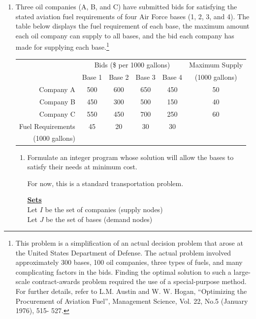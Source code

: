 \documentclass[letterpaper,oneside,12pt]{article}%
\newcommand{\blu}{\color{blue}}
\begin{document}
\begin{enumerate}
\begin{enumerate}
{}
\end{enumerate}

\newpage

\item Three oil companies (A, B, and C) have submitted bids for satisfying the stated
aviation fuel requirements of four Air Force bases (1, 2, 3, and 4). The table
below displays the fuel requirement of each base, the maximum amount each oil
company can supply to all bases, and the bid each company has made for
supplying each base.\footnote{This problem is a simplification of an actual decision problem
that arose at the United States Department of Defense. The actual problem
involved approximately 300 bases, 100 oil companies, three types of fuels, and
many complicating factors in the bids. Finding the optimal solution to such a
large-scale contract-awards problem required the use of a special-purpose
method. For further details, refer to L.M. Austin and W. W. Hogan, ``Optimizing
the Procurement of Aviation Fuel'', Management Science, Vol. 22, No.5 (January
1976), 515- 527.}

\begin{center}\begin{tabular}{|r|cccc|c|}\hline
    & \multicolumn{4}{c|}{Bids (\$ per 1000 gallons)} & Maximum Supply \\\cline{2-5}
    & Base 1 & Base 2 & Base 3 & Base 4 & (1000 gallons) \\\hline
  Company A & 500 & 600 & 650 & 450 & 50 \\
  Company B & 450 & 300 & 500 & 150 & 40 \\
  Company C & 550 & 450 & 700 & 250 & 60 \\\hline
  Fuel Requirements & 45 & 20 & 30 & 30 & \\
  (1000 gallons) &  &  &  &  & \\\hline
\end{tabular}\end{center}

\begin{enumerate}
\item Formulate an integer program whose solution will allow the bases to satisfy their needs at minimum cost.

{
\blu

For now, this is a standard transportation problem.

\textbf{\underline{Sets}} \\
Let $I$ be the set of companies (supply nodes)\\
Let $J$ be the set of bases (demand nodes)

}
\end{enumerate}
\end{enumerate}
\end{document}
